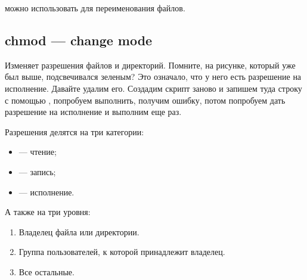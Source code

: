 \documentclass[letterpaper,10pt,russian]{sphinxmanual}
\begin{document}
\sphinxAtStartPar
{}

\sphinxAtStartPar
{} можно использовать для переименования файлов.

\sphinxAtStartPar
{}


\subsection{chmod — change mode}
\label{\detokenize{educational_materials/bash/content:chmod-change-mode}}
\sphinxAtStartPar
Изменяет разрешения файлов и директорий. Помните, на рисунке, который уже был выше,  подсвечивался зеленым? Это означало, что у него есть разрешение на исполнение. Давайте удалим его. Создадим скрипт заново и запишем туда строку  с помощью , попробуем выполнить, получим ошибку, потом попробуем дать разрешение на исполнение и выполним еще раз.

\sphinxAtStartPar
{}

\sphinxAtStartPar
Разрешения делятся на три категории:
\begin{itemize}
\item {} 
\sphinxAtStartPar
{}  — чтение;

\item {} 
\sphinxAtStartPar
{}  — запись;

\item {} 
\sphinxAtStartPar
{}  — исполнение.

\end{itemize}

\sphinxAtStartPar
А также на три уровня:
\begin{enumerate}
%
\item {} 
\sphinxAtStartPar
Владелец файла или директории.

\item {} 
\sphinxAtStartPar
Группа пользователей, к которой принадлежит владелец.

\item {} 
\sphinxAtStartPar
Все остальные.

\end{enumerate}
\end{document}
